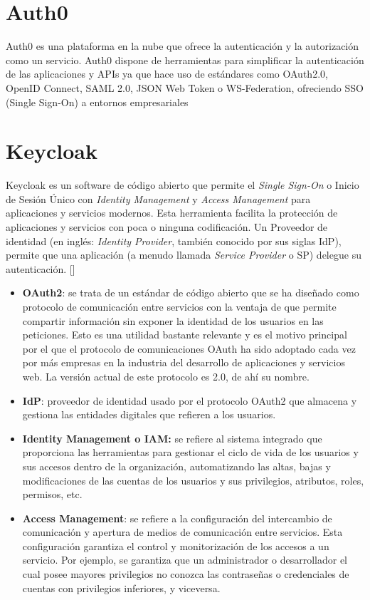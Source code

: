\section{Auth0}
Auth0 es una plataforma en la nube que ofrece la autenticación y la autorización como un servicio. Auth0 dispone de herramientas para simplificar la autenticación de las aplicaciones y APIs ya que hace uso de estándares como OAuth2.0, OpenID Connect, SAML 2.0, JSON Web Token o WS-Federation, ofreciendo SSO (Single Sign-On) a entornos empresariales

\section{Keycloak}
Keycloak es un software de código abierto que permite el \textit{Single Sign-On} o Inicio de Sesión Único con \textit{Identity Management} y \textit{Access Management} para aplicaciones y servicios modernos. Esta herramienta facilita la protección de aplicaciones y servicios con poca o ninguna codificación. Un Proveedor de identidad (en inglés: \textit{Identity Provider}, también conocido por sus siglas IdP), permite que una aplicación (a menudo llamada \textit{Service Provider} o SP) delegue su autenticación. [\cite{KeycloakDoc}]

\begin{itemize}
	\item \textbf{OAuth2}: se trata de un estándar de código abierto que se ha diseñado como protocolo de comunicación entre servicios con la ventaja de que permite compartir información sin exponer la identidad de los usuarios en las peticiones. Esto es una utilidad bastante relevante y es el motivo principal por el que el protocolo de comunicaciones OAuth ha sido adoptado cada vez por más empresas en la industria del desarrollo de aplicaciones y servicios web. La versión actual de este protocolo es 2.0, de ahí su nombre.
	
	\item \textbf{IdP}: proveedor de identidad usado por el protocolo OAuth2 que almacena y gestiona las entidades digitales que refieren a los usuarios.
	
	\item \textbf{Identity Management o IAM: }se refiere al sistema integrado que proporciona las herramientas para gestionar el ciclo de vida de los usuarios y sus accesos dentro de la organización, automatizando las altas, bajas y modificaciones de las cuentas de los usuarios y sus privilegios, atributos, roles, permisos, etc.
	
	\item \textbf{Access Management}: se refiere a la configuración del intercambio de comunicación y apertura de medios de comunicación entre servicios. Esta configuración garantiza el control y monitorización de los accesos a un servicio. Por ejemplo, se garantiza que un administrador o desarrollador el cual posee mayores privilegios no conozca las contraseñas o credenciales de cuentas con privilegios inferiores, y viceversa. 
\end{itemize}

